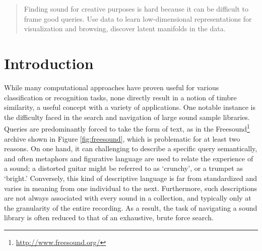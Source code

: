 \documentclass{article}
\begin{document}

\begin{abstract}

Finding sound for creative purposes is hard because it can be difficult to frame good queries.
Use data to learn low-dimensional representations for visualization and browsing, discover latent manifolds in the data.


\end{abstract}

\section{Introduction}
\label{submission}

While many computational approaches have proven useful for various classification or recognition tasks, none directly result in a notion of timbre similarity, a useful concept with a variety of applications.
One notable instance is the difficulty faced in the search and navigation of large sound sample libraries.
Queries are predominantly forced to take the form of text, as in the Freesound\footnote{\url{http://www.freesound.org/}} archive shown in Figure \ref{fig:freesound}, which is problematic for at least two reasons.
On one hand, it can challenging to describe a specific query semantically, and often metaphors and figurative language are used to relate the experience of a sound; a distorted guitar might be referred to as `crunchy', or a trumpet as `bright.'
Conversely, this kind of descriptive language is far from standardized and varies in meaning from one individual to the next.
Furthermore, such descriptions are not always associated with every sound in a collection, and typically only at the granularity of the entire recording.
As a result, the task of navigating a sound library is often reduced to that of an exhaustive, brute force search.
\end{document}
